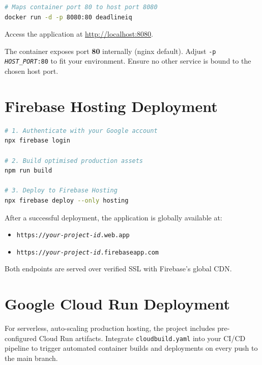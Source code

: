 \documentclass[12pt,a4paper]{report}
\begin{document}
\begin{tcolorbox}[codebox]
\begin{lstlisting}[language=bash]
# Maps container port 80 to host port 8080
docker run -d -p 8080:80 deadlineiq
\end{lstlisting}
\end{tcolorbox}

Access the application at \url{http://localhost:8080}.

\begin{tcolorbox}[warningbox, title={Port Mapping Note}]
The container exposes port \textbf{80} internally (nginx default). Adjust \texttt{-p \textit{HOST\_PORT}:80} to fit your environment. Ensure no other service is bound to the chosen host port.
\end{tcolorbox}

\section{Firebase Hosting Deployment}

\begin{tcolorbox}[codebox]
\begin{lstlisting}[language=bash]
# 1. Authenticate with your Google account
npx firebase login

# 2. Build optimised production assets
npm run build

# 3. Deploy to Firebase Hosting
npx firebase deploy --only hosting
\end{lstlisting}
\end{tcolorbox}

After a successful deployment, the application is globally available at:
\begin{itemize}[noitemsep]
  \item \texttt{https://\textit{your-project-id}.web.app}
  \item \texttt{https://\textit{your-project-id}.firebaseapp.com}
\end{itemize}

Both endpoints are served over verified SSL with Firebase's global CDN.

\section{Google Cloud Run Deployment}

For serverless, auto-scaling production hosting, the project includes pre-configured Cloud Run artifacts. Integrate \texttt{cloudbuild.yaml} into your CI/CD pipeline to trigger automated container builds and deployments on every push to the main branch.
\end{document}
